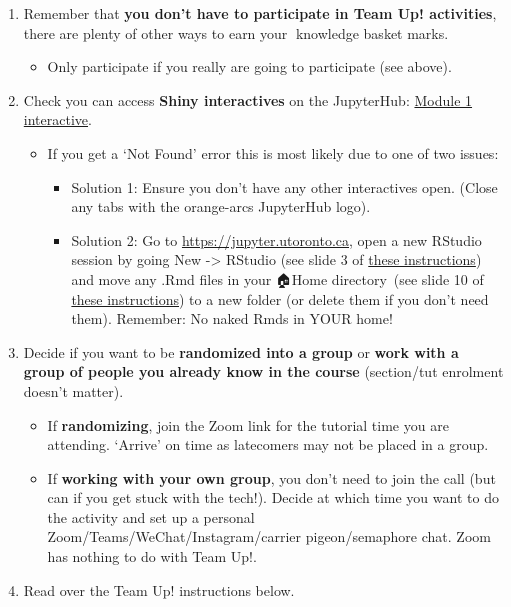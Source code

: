 \documentclass[
  openany]{book}
\providecommand{\tightlist}{%
  \setlength{\itemsep}{0pt}\setlength{\parskip}{0pt}}
\begin{document}
\begin{enumerate}
\def\labelenumi{\arabic{enumi}.}
\item
  Remember that \textbf{you don't have to participate in Team Up! activities}, there are plenty of other ways to earn your 🧺knowledge basket marks.~

  \begin{itemize}
  \tightlist
  \item
    Only participate if you really are going to participate (see above).
  \end{itemize}
\item
  Check you can access \textbf{Shiny interactives} on the JupyterHub: \href{https://jupyter.utoronto.ca/hub/user-redirect/git-pull?repo=https\%3A\%2F\%2Fgithub.com\%2Fsta303-bolton\%2Fsta303-w22-activities\&urlpath=shiny\%2Fsta303-w22-activities\%2Finst\%2Ftutorials\%2Fsta303_m1_tests\%2F\&branch=master}{Module 1 interactive}.

  \begin{itemize}
  \item
    If you get a `Not Found' error this is most likely due to one of two issues:

    \begin{itemize}
    \item
      Solution 1: Ensure you don't have any other interactives open. (Close any tabs with the orange-arcs JupyterHub logo).
    \item
      Solution 2: Go to \url{https://jupyter.utoronto.ca}, open a new RStudio session by going New -\textgreater{} RStudio (see slide 3 of \href{https://sta303-bolton.github.io/sta303-w22-courseguide/resources.html\#using-rstudio-with-the-jupyterhub}{these instructions}) and move any .Rmd files in your 🏠Home directory~(see slide 10 of \href{https://sta303-bolton.github.io/sta303-w22-courseguide/resources.html\#using-rstudio-with-the-jupyterhub}{these instructions}) to a new folder (or delete them if you don't need them). Remember: No naked Rmds in YOUR home!
    \end{itemize}
  \end{itemize}
\item
  Decide if you want to be \textbf{randomized into a group} or \textbf{work with a group of people you already know in the course} (section/tut enrolment doesn't matter).

  \begin{itemize}
  \item
    If \textbf{randomizing}, join the Zoom link for the tutorial time you are attending. `Arrive' on time as latecomers may not be placed in a group.
  \item
    If \textbf{working with your own group}, you don't need to join the call (but can if you get stuck with the tech!). Decide at which time you want to do the activity and set up a personal Zoom/Teams/WeChat/Instagram/carrier pigeon/semaphore chat. Zoom has nothing to do with Team Up!.
  \end{itemize}
\item
  Read over the Team Up! instructions below.
\end{enumerate}
\end{document}
